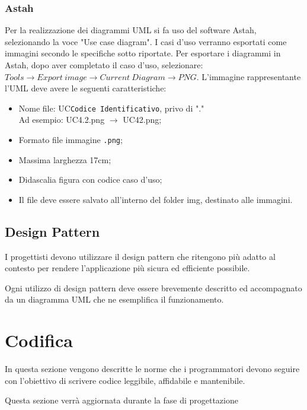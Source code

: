 \subsubsection{Astah}
Per la realizzazione dei diagrammi UML si fa uso del software Astah, selezionando la voce "Use case diagram". 
I casi d'uso verranno esportati come immagini secondo le specifiche sotto riportate. Per esportare i diagrammi in Astah, dopo aver completato il caso d'uso, selezionare: $Tools \rightarrow Export\ image \rightarrow Current\ Diagram \rightarrow PNG$.
L'immagine rappresentante l'UML deve avere le seguenti caratteristiche:
\begin{itemize}
\item Nome file: UC\texttt{Codice Identificativo}, privo di "."\\
Ad esempio: UC4.2.png $\rightarrow$ UC42.png;
\item Formato file immagine \texttt{.png};
\item Massima larghezza 17cm;
\item Didascalia figura con codice caso d'uso;
\item Il file deve essere salvato all'interno del folder img, destinato alle immagini.
\end{itemize}

\subsection{Design Pattern}

I progettisti devono utilizzare il design pattern che ritengono più adatto al contesto per rendere l'applicazione più sicura ed efficiente possibile.

Ogni utilizzo di design pattern deve essere brevemente descritto ed accompagnato da un diagramma UML che ne esemplifica il funzionamento.

\section{Codifica}
In questa sezione vengono descritte le norme che i programmatori devono seguire con l'obiettivo di scrivere codice leggibile, affidabile e mantenibile.

Questa sezione verrà aggiornata durante la fase di progettazione

